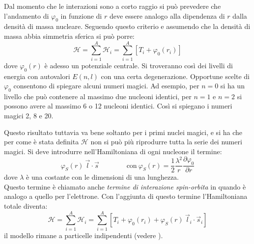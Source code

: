 Dal momento che le interazioni sono a corto raggio si può prevedere che l'andamento di $\varphi_0$ in funzione di $r$ deve essere analogo alla dipendenza di $r$ dalla densità di massa nucleare. Seguendo questo criterio e assumendo che la densità di massa abbia simmetria sferica si può porre:
\begin{equation}
\mathcal{H} = \sum_{i=1}^A \mathcal{H}_i = \sum_{i=1}^A \left[ T_i + \varphi_0{(r_i)} \right] 
\end{equation}
dove $\varphi_0(r)$ è adesso un potenziale centrale. Si troveranno così dei livelli di energia con autovalori $E{(n, l)}$ con una certa degenerazione. Opportune scelte di $\varphi_0$ consentono di spiegare alcuni numeri magici. Ad esempio, per $n = 0$ si ha un livello che può contenere al massimo due nucleoni identici, per $n = 1$ e $n = 2$ si possono avere al massimo 6 o 12 nucleoni identici. Così si spiegano i numeri magici 2, 8 e 20.

Questo risultato tuttavia va bene soltanto per i primi nuclei magici, e si ha che per come è stata definita $\mathcal{H}$ non si può più riprodurre tutta la serie dei numeri magici. Si deve introdurre nell'Hamiltoniana di ogni nucleone il termine:
\begin{equation}
\varphi_S{(r)}\ \vec{l} \cdot \vec{s} \qquad \qquad\text{con}\ \varphi_S{(r)} = \frac{1}{2} \frac{\lambda^2}{r} \frac{\partial \varphi_0}{\partial r}
\end{equation}
dove $\lambda$ è una costante con le dimensioni di una lunghezza.
\\
Questo termine è chiamato anche \textit{termine di interazione spin-orbita} in quando è analogo a quello per l'elettrone. Con l'aggiunta di questo termine l'Hamiltoniana totale diventa:
\begin{equation}
\mathcal{H} = \sum_{i=1}^A \mathcal{H}_i = \sum_{i=1}^A \left[ T_i + \varphi_0{(r_i)} + \varphi_S{(r)}\ \vec{l}_i \cdot \vec{s}_i \right] 
\end{equation}
il modello rimane a particelle indipendenti (vedere \pageref{allegato_6}).


